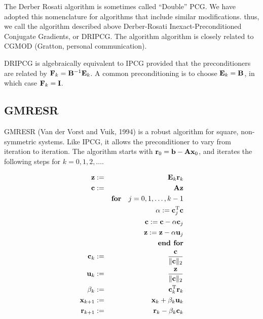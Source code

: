 \documentclass[12pt]{article}
\newcommand{\vect}[1]{{\bf #1}}                         %
\newcommand{\mat}[1]{{\bf #1}}                          %
\newcommand{\rmT}{{\rm T}}                           %
\begin{document}
The Derber Rosati algorithm is sometimes called ``Double'' PCG. We have
adopted this nomenclature for algorithms that include similar
modifications. thus, we call the algorithm described above
Derber-Rosati Inexact-Preconditioned Conjugate Gradients, or DRIPCG.
The algorithm algorithm is closely related to CGMOD
(Gratton, personal communication).

DRIPCG is algebraically equivalent to IPCG provided that the preconditioners
are related by $\mat{F}_k = \mat{B}^{-1} \mat{E}_k$. A common preconditioning
is to choose $\mat{E}_k = \mat{B}$, in which case $\mat{F}_k = \mat{I}$.

\subsection{GMRESR}

GMRESR (Van der Vorst and Vuik, 1994) is a robust algorithm for square,
non-symmetric systems. Like IPCG, it allows the preconditioner to vary
from iteration to iteration. The algorithm starts with
$ \vect{r}_0 = \vect{b} - \mat{A}\vect{x}_0$, and iterates the following
steps for $k=0,1,2,\ldots$.
\begin{center}
\begin{minipage}{0.8\textwidth}
\begin{eqnarray}
  \vect{z} &:=& \mat{E}_k \vect{r}_k \\
  \vect{c} &:=& \mat{A}\vect{z} \\
  && \mbox{\bf for} \quad j = 0,1,\ldots,k-1 \nonumber \\
  && \qquad \alpha := \vect{c}_j^\rmT \vect{c} \\
  && \qquad \vect{c} := \vect{c} - \alpha \vect{c}_j \\
  && \qquad \vect{z} := \vect{z} - \alpha \vect{u}_j \\
  && \mbox{\bf end for} \nonumber \\
  \vect{c}_k &:=& \frac{\vect{c}}{\Vert \vect{c} \Vert_2} \\
  \vect{u}_k &:=& \frac{\vect{z}}{\Vert \vect{c} \Vert_2} \\
  \beta_k &:=& \vect{c}_k^\rmT \vect{r}_k \\
  \vect{x}_{k+1} &:=& \vect{x}_k + \beta_k \vect{u}_k \\
  \vect{r}_{k+1} &:=& \vect{r}_k - \beta_k \vect{c}_k
\end{eqnarray}
\end{minipage}
\end{center}
\end{document}
